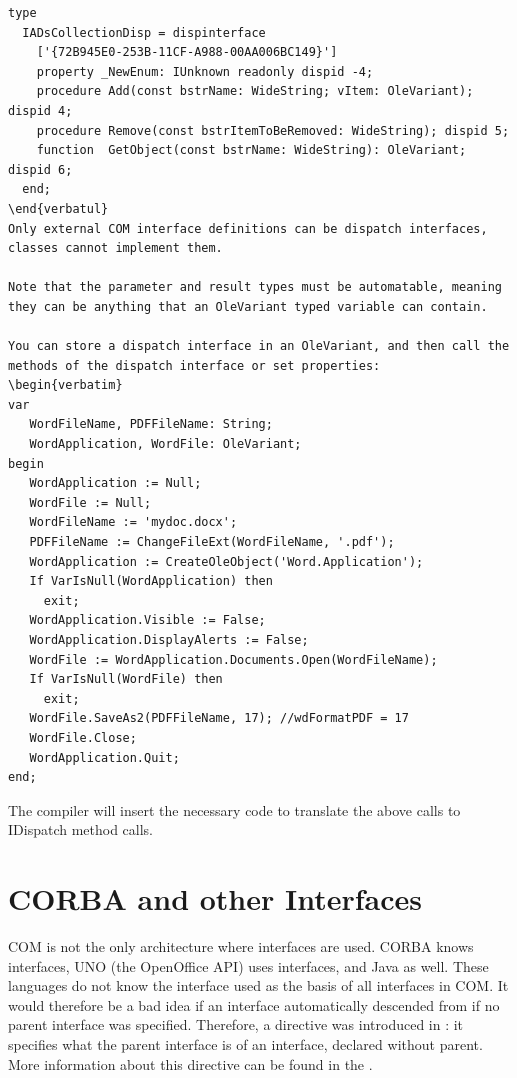 \begin{verbatim}
type
  IADsCollectionDisp = dispinterface
    ['{72B945E0-253B-11CF-A988-00AA006BC149}']
    property _NewEnum: IUnknown readonly dispid -4;
    procedure Add(const bstrName: WideString; vItem: OleVariant); dispid 4;
    procedure Remove(const bstrItemToBeRemoved: WideString); dispid 5;
    function  GetObject(const bstrName: WideString): OleVariant; dispid 6;
  end;
\end{verbatul}  
Only external COM interface definitions can be dispatch interfaces, classes cannot implement them.

Note that the parameter and result types must be automatable, meaning they can be anything that an OleVariant typed variable can contain. 

You can store a dispatch interface in an OleVariant, and then call the methods of the dispatch interface or set properties:
\begin{verbatim}
var
   WordFileName, PDFFileName: String;
   WordApplication, WordFile: OleVariant;
begin
   WordApplication := Null;
   WordFile := Null;
   WordFileName := 'mydoc.docx';
   PDFFileName := ChangeFileExt(WordFileName, '.pdf');
   WordApplication := CreateOleObject('Word.Application');
   If VarIsNull(WordApplication) then
     exit;
   WordApplication.Visible := False; 
   WordApplication.DisplayAlerts := False; 
   WordFile := WordApplication.Documents.Open(WordFileName);
   If VarIsNull(WordFile) then
     exit;
   WordFile.SaveAs2(PDFFileName, 17); //wdFormatPDF = 17
   WordFile.Close;
   WordApplication.Quit;
end;
\end{verbatim}
The compiler will insert the necessary code to translate the above calls to IDispatch method calls.

\section{CORBA and other Interfaces}
COM is not the only architecture where interfaces are used. CORBA knows
interfaces, UNO (the OpenOffice API) uses interfaces, and Java as well.
These languages do not know the  interface used as the basis of
all interfaces in COM. It would therefore be a bad idea if an interface
automatically descended from  if no parent interface was
specified. Therefore, a directive  was introduced in
 \fpc: it specifies what the parent interface is of an interface, declared
without parent. More information about this directive can be found in the
\progref.

